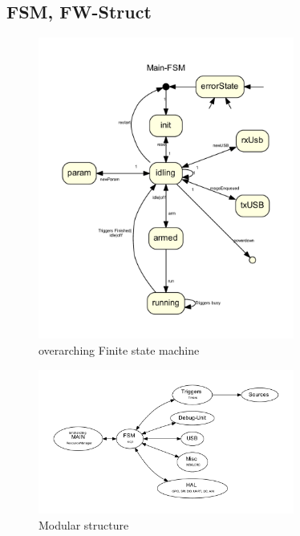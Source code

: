 	\subsection{FSM, FW-Struct}
		\begin{figure}[H]
			\center
			\includegraphics[width=0.75\textwidth]{src/_mainFSM_neato.pdf}
			\caption{overarching Finite state machine}
			\label{fig:FSM}
		\end{figure}


		\begin{figure}[H]
			\center
			\includegraphics[width=0.75\textwidth]{src/_FW-Modules.pdf}
			\caption{Modular structure}
			\label{fig:_FW-Modules}
		\end{figure}
	


